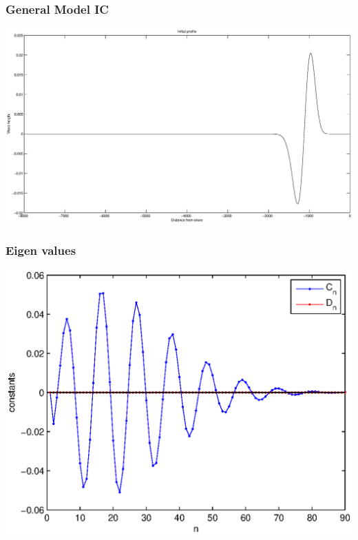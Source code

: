 



\begin{frame}
		\frametitle{General Model IC}
		\includegraphics[width=\textwidth]{IC.eps}
		\end{frame}

\begin{frame}
		\frametitle{Eigen values}
		\includegraphics[width=\textwidth]{Const.eps}
		\end{frame}

	
	
